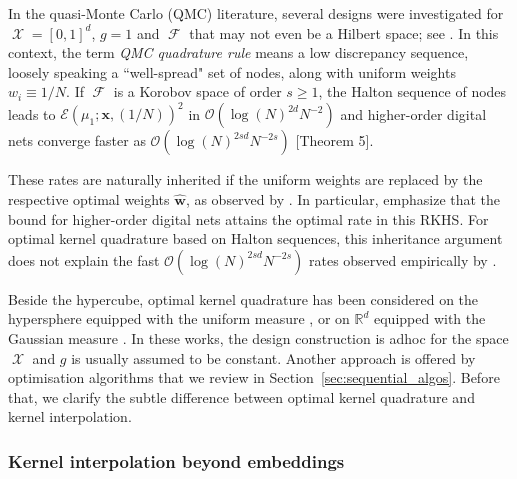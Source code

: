 \documentclass[twoside,11pt]{book}
\DeclareMathOperator{\F}{\mathcal{F}}
\DeclareMathOperator{\X}{\mathcal{X}}
\begin{document}
In the quasi-Monte Carlo (QMC) literature, several designs were investigated for $\X = [0,1]^{d}$, $g = 1$ and $\F$ that may not even be a Hilbert space; see \citep{DiPi10}. In this context, the term \emph{QMC quadrature rule} means a low discrepancy sequence, loosely speaking a ``well-spread" set of nodes, along with uniform weights $w_{i} \equiv 1/N$. If $\F$ is a Korobov space of order $s \geq 1$, the Halton sequence of nodes \citep{Hal64} leads to $\mathcal{E}(\mu_1; \bm{x}, (1/N))^2$ in $\mathcal{O}(\log(N)^{2d} N^{-2})$ and higher-order digital nets converge faster as $\mathcal{O}(\log(N)^{2sd} N^{-2s})$ \citep{DiPi14}[Theorem 5].

These rates are naturally inherited if the uniform weights are replaced by the respective optimal weights $\hat{\bm{w}}$, as observed by \cite{BOGOS2019}. In particular, \cite{BOGOS2019} emphasize that the bound for higher-order digital nets attains the optimal rate in this RKHS.
For optimal kernel quadrature based on Halton sequences, this inheritance argument does not explain the fast $\mathcal{O}(\log(N)^{2sd} N^{-2s})$ rates observed empirically by \cite{Oett17}.

Beside the hypercube, optimal kernel quadrature has been considered on the hypersphere equipped with the uniform measure \citep{EhGrCh19}, or on $\mathbb{R}^{d}$ equipped with the Gaussian measure \citep{KaSa19}. In these works, the design construction is adhoc for the space $\X$ and
$g$ is usually assumed to be constant. Another approach is offered by optimisation algorithms that we review in Section~\ref{sec:sequential_algos}. Before that, we clarify the subtle difference between optimal kernel quadrature and kernel interpolation.

\subsubsection{Kernel interpolation beyond embeddings}\label{sec:review_kernel_interpolation_beyond_mu}
\end{document}

